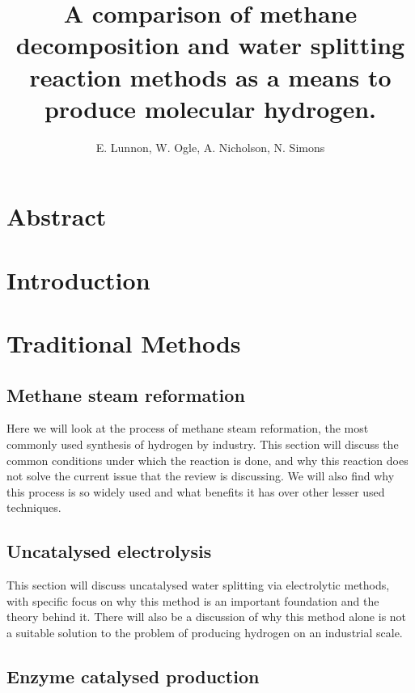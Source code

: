 \documentclass[a4paper]{article}
\title{A comparison of methane decomposition and water splitting reaction methods as a means to produce molecular hydrogen.}
\author{E. Lunnon, W. Ogle, A. Nicholson, N. Simons}
\begin{document}
\maketitle
\tableofcontents
\newpage


\section*{Abstract}%
\label{sec:abstract}
\clearpage


\section{Introduction}%
\label{sec:introduction}



\clearpage

\section{Traditional Methods}%
\label{sub:Traditional_Methods}

\subsection{Methane steam reformation}%
\label{sub:Steam_reformation}

Here we will look at the process of methane steam reformation, the most commonly used synthesis of hydrogen by industry.
This section will discuss the common conditions under which the reaction is done, and why this reaction does not solve the current issue that the review is discussing.
We will also find why this process is so widely used and what benefits it has over other lesser used techniques.

\subsection{Uncatalysed electrolysis}%
\label{sub:Uncatalysed_electrolysis}

This section will discuss uncatalysed water splitting via electrolytic methods, with specific focus on why this method is an important foundation and the theory behind it.
There will also be a discussion of why this method alone is not a suitable solution to the problem of producing hydrogen on an industrial scale.

\subsection{Enzyme catalysed production}%
\label{sub:enzyme_catalysed_production}
\end{document}
